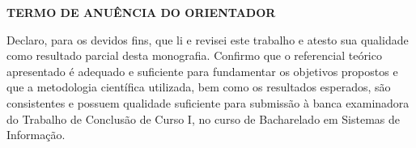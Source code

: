 %
\begin{center}
{\large \uppercase{\textbf{Termo de Anuência do Orientador}}}
\end{center}
Declaro, para os devidos fins, que li e revisei este trabalho e atesto sua qualidade como resultado parcial desta monografia. Confirmo que o referencial teórico apresentado é adequado e suficiente para fundamentar os objetivos propostos e que a metodologia científica utilizada, bem como os resultados esperados, são consistentes e possuem qualidade suficiente para submissão à banca examinadora do Trabalho de Conclusão de Curso I, no curso de Bacharelado em Sistemas de Informação.

